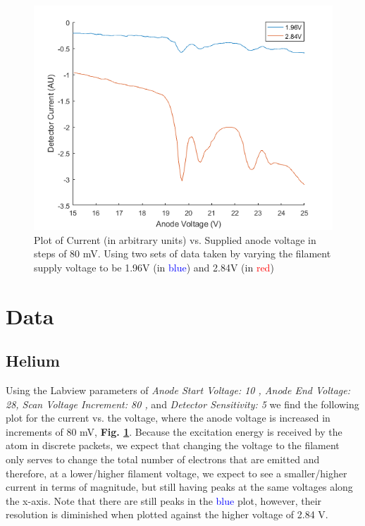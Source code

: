 \documentclass[%
 reprint,
 amsmath,amssymb,
 aps,
]{revtex4-1}
\begin{document}
\begin{figure}[!ht]\centering
\includegraphics[width = .5\textwidth,keepaspectratio]{fig1.png}
\caption{Plot of Current (in arbitrary units) vs. Supplied anode voltage in steps of 80 mV. Using two sets of data taken by varying the filament supply voltage to be 1.96V (in \textcolor{blue}{blue}) and 2.84V (in \textcolor{red}{red})}
\label{fig:heltwo}
\end{figure}

\section{\label{sec:data}Data}

\subsection{\label{sec:held}Helium}

Using the Labview parameters of \textit{Anode Start Voltage: 10 , Anode End Voltage: 28, Scan Voltage Increment: 80 ,} and \textit{Detector Sensitivity: 5} we find the following plot for the current vs. the voltage, where the anode voltage is increased in increments of 80 mV, \textbf{Fig. \ref{fig:heltwo}}. Because the excitation energy is received by the atom in discrete packets, we expect that changing the voltage to the filament only serves to change the total number of electrons that are emitted and therefore, at a lower/higher filament voltage, we expect to see a smaller/higher current in terms of magnitude, but still having peaks at the same voltages along the x-axis. Note that there are still peaks in the \textcolor{blue}{blue} plot, however, their resolution is diminished when plotted against the higher voltage of 2.84 V.
\end{document}
